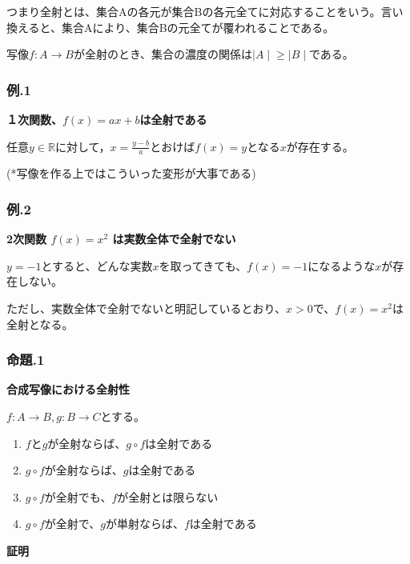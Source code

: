 \documentclass[dvipdfmx,autodetect-engine]{jsarticle}
\begin{document}
つまり全射とは、集合Aの各元が集合Bの各元全てに対応することをいう。言い換えると、集合Aにより、集合Bの元全てが覆われることである。

写像$f: A \to B$が全射のとき、集合の濃度の関係は${\mid A \mid} \geq {\mid B \mid}$である。

\subsubsection { 例.1 }

{\bf １次関数、$f(x) = ax+b$は全射である}

任意$y \in \mathbb{R}$に対して，$x = \frac{y-b}{a}$とおけば$f(x) = y$となる$x$が存在する。

(*写像を作る上ではこういった変形が大事である)


\subsubsection { 例.2 }
{\bf 2次関数 $f(x)=x^2$ は実数全体で全射でない}

$y=-1$とすると、どんな実数$x$を取ってきても、$f(x) = -1$になるような$x$が存在しない。

ただし、実数全体で全射でないと明記しているとおり、$x > 0$で、$f(x)=x^2$は全射となる。


\subsubsection{ 命題.1 }

 {\bf 合成写像における全射性 }
 
 $f:A \to B, g: B \to C$とする。

\begin{enumerate}
	\item $f$と$g$が全射ならば、$g \circ f$は全射である
	\item $g \circ f$が全射ならば、$g$は全射である
	\item $g \circ f$が全射でも、$f$が全射とは限らない
	\item $g \circ f$が全射で、$g$が単射ならば、$f$は全射である
\end{enumerate}

{ \bf 証明}
\end{document}

